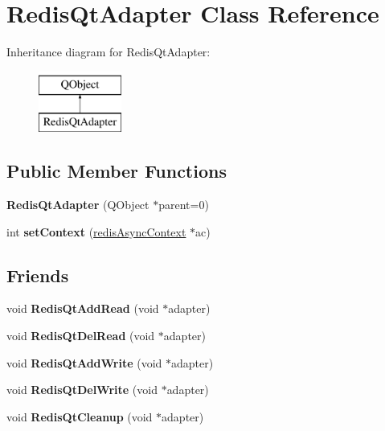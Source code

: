 \hypertarget{class_redis_qt_adapter}{}\section{Redis\+Qt\+Adapter Class Reference}
\label{class_redis_qt_adapter}
Inheritance diagram for Redis\+Qt\+Adapter\+:\begin{figure}[H]
\begin{center}
\leavevmode
\includegraphics[height=2.000000cm]{class_redis_qt_adapter}
\end{center}
\end{figure}
\subsection*{Public Member Functions}
\begin{DoxyCompactItemize}
\item 
\mbox{\label{class_redis_qt_adapter_a81ea7cccc1ee7630afc739c20fecf868}} 
{\bfseries Redis\+Qt\+Adapter} (Q\+Object $\ast$parent=0)
\item 
\mbox{\label{class_redis_qt_adapter_a7189a89d981e7c8b7a6de68ae1972bee}} 
int {\bfseries set\+Context} (\mbox{\hyperlink{structredis_async_context}{redis\+Async\+Context}} $\ast$ac)
\end{DoxyCompactItemize}
\subsection*{Friends}
\begin{DoxyCompactItemize}
\item 
\mbox{\label{class_redis_qt_adapter_ac409536f14d25acb71bdf215d9011d41}} 
void {\bfseries Redis\+Qt\+Add\+Read} (void $\ast$adapter)
\item 
\mbox{\label{class_redis_qt_adapter_a1d82512957df3da1367ef6512c713ac1}} 
void {\bfseries Redis\+Qt\+Del\+Read} (void $\ast$adapter)
\item 
\mbox{\label{class_redis_qt_adapter_a9784ddb1261db4538070de4ce75aa8d7}} 
void {\bfseries Redis\+Qt\+Add\+Write} (void $\ast$adapter)
\item 
\mbox{\label{class_redis_qt_adapter_ab17cffda634d28ce2e0467ca8c1e0666}} 
void {\bfseries Redis\+Qt\+Del\+Write} (void $\ast$adapter)
\item 
\mbox{\label{class_redis_qt_adapter_ab4f4f4eab9c4a9d4209c9869859412b4}} 
void {\bfseries Redis\+Qt\+Cleanup} (void $\ast$adapter)
\end{DoxyCompactItemize}


